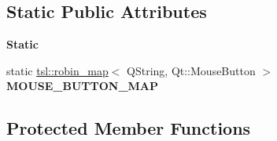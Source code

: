 \subsection*{Static Public Attributes}
\begin{Indent}\textbf{ Static}\par
\begin{DoxyCompactItemize}
\item 
static \mbox{\hyperlink{classtsl_1_1robin__map}{tsl\+::robin\+\_\+map}}$<$ Q\+String, Qt\+::\+Mouse\+Button $>$ {\bfseries M\+O\+U\+S\+E\+\_\+\+B\+U\+T\+T\+O\+N\+\_\+\+M\+AP}
\end{DoxyCompactItemize}
\end{Indent}
\subsection*{Protected Member Functions}
